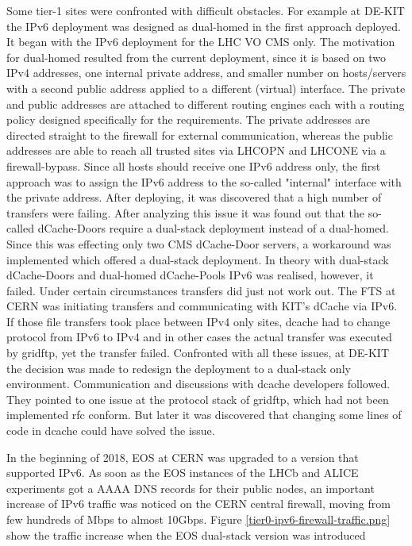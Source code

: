 Some tier-1 sites were confronted with difficult obstacles. For example at DE-KIT the IPv6 deployment was designed as dual-homed in the first approach deployed. It began with the IPv6 deployment for the LHC VO CMS only. The motivation for dual-homed resulted from the current deployment, since it is based on two IPv4 addresses, one internal private address, and smaller number on hosts/servers with a second public address applied to a different (virtual) interface. The private and public addresses are attached to different routing engines each with a routing policy designed specifically for the requirements. The private addresses are directed straight to the firewall for external communication, whereas the public addresses are able to reach all trusted sites via LHCOPN and LHCONE via a firewall-bypass. Since all hosts should receive one IPv6 address only, the first approach was to assign the IPv6 address to the so-called "internal" interface with the private address. After deploying, it was discovered that a high number of transfers were failing. After analyzing this issue it was found out that the so-called dCache-Doors require a dual-stack deployment instead of a dual-homed. Since this was effecting only two CMS dCache-Door servers, a workaround was implemented which offered a dual-stack deployment. In theory with dual-stack dCache-Doors and dual-homed dCache-Pools IPv6 was realised, however, it failed. Under certain circumstances transfers did just not work out. The FTS at CERN was initiating transfers and communicating with KIT’s  dCache via IPv6. If those file transfers took place between IPv4 only sites, dcache had to change protocol from IPv6 to IPv4 and in other cases the actual transfer was  executed by gridftp, yet the transfer failed. Confronted with all these issues, at DE-KIT the decision was made to redesign the deployment to a dual-stack only environment.  Communication and discussions with dcache developers followed. They pointed to one issue at the protocol stack of gridftp, which had not been implemented rfc conform. But later it was discovered that changing some lines of code in dcache could have solved the issue.
  
In the beginning of 2018, EOS at CERN was upgraded to a version that supported IPv6.  
As soon as the EOS instances of the LHCb and ALICE experiments got a AAAA DNS records for their public nodes, an important increase of IPv6 traffic was noticed on the CERN central firewall, moving from few hundreds of Mbps to almost 10Gbps. 
Figure \ref{tier0-ipv6-firewall-traffic.png} show the traffic increase when the EOS dual-stack version was introduced
 
